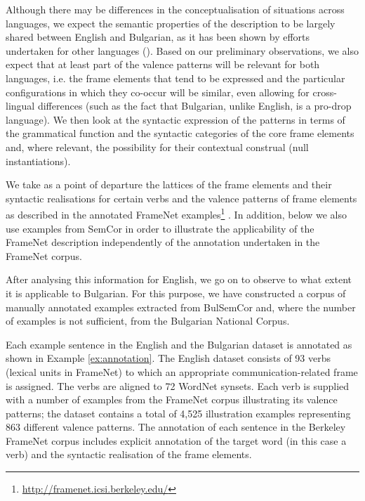 \documentclass[output=paper,colorlinks,citecolor=brown]{langscibook}
\begin{document}
Although there may be differences in the conceptualisation of situations across languages, we expect the semantic properties of the description to be largely shared between English and Bulgarian, as it has been shown by efforts undertaken for other languages (). Based on our preliminary observations, we also expect that at least part of the valence patterns will be relevant for both languages, i.e. the frame elements that tend to be expressed and the particular configurations in which they co-occur will be similar, even allowing for cross-lingual differences (such as the fact that Bulgarian, unlike English, is a pro-drop language). We then look at the syntactic expression of the patterns in terms of the grammatical function and the syntactic categories of the core frame elements and, where relevant, the possibility for their contextual construal (null instantiations).

We take as a point of departure the lattices of the frame elements and their syntactic realisations for certain verbs and the valence patterns of frame elements as described in the annotated FrameNet examples\footnote{\url{http://framenet.icsi.berkeley.edu/}} \citep{Burchardt2008}. %
In addition, below we also use examples from SemCor in order to illustrate the applicability of the FrameNet description independently of the annotation undertaken in the FrameNet corpus.

After analysing this information for English, we go on to observe to what extent it is applicable to Bulgarian. For this purpose, we have constructed a corpus of manually annotated examples extracted from BulSemCor and, where the number of examples is not sufficient, from the Bulgarian National Corpus. 

Each example sentence in the English and the Bulgarian dataset is annotated as shown in Example \ref{ex:annotation}. The English dataset consists of 93 verbs (lexical units in FrameNet) to which an appropriate communication-related frame is assigned. The verbs are aligned to 72 WordNet synsets. %
Each verb is supplied with a number of examples from the FrameNet corpus illustrating its valence patterns; the dataset contains a total of 4,525 illustration examples representing 863 different valence patterns. The annotation of each sentence in the Berkeley FrameNet corpus includes explicit annotation of the target word (in this case a verb) and the syntactic realisation of the frame elements.
\end{document}
